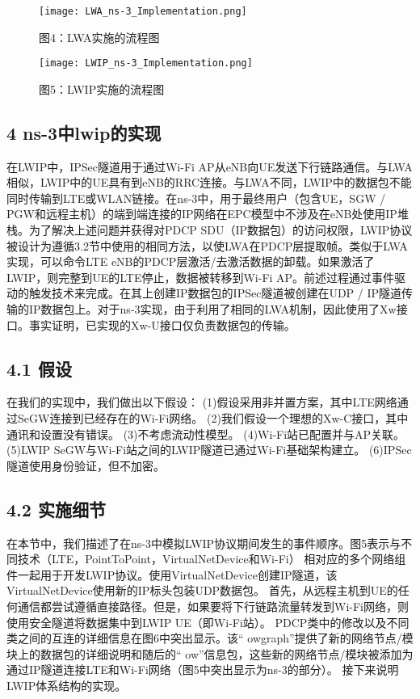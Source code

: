 \begin{figure}[htb]
  \centering
  \texttt{[image: LWA\_ns-3\_Implementation.png]}
  \caption*{图4：LWA实施的流程图}
\end{figure}


\begin{figure}[htb]
  \centering
  \texttt{[image: LWIP\_ns-3\_Implementation.png]}
  \caption{图5：LWIP实施的流程图}
\end{figure}

\newpage
\subsection*{4 ns-3中lwip的实现}
在LWIP中，IPSec隧道用于通过Wi-Fi AP从eNB向UE发送下行链路通信。与LWA相似，LWIP中的UE具有到eNB的RRC连接。与LWA不同，LWIP中的数据包不能同时传输到LTE或WLAN链接。在ns-3中，用于最终用户（包含UE，SGW / PGW和远程主机）的端到端连接的IP网络在EPC模型中不涉及在eNB处使用IP堆栈。为了解决上述问题并获得对PDCP SDU（IP数据包）的访问权限，LWIP协议被设计为遵循3.2节中使用的相同方法，以使LWA在PDCP层提取帧。类似于LWA实现，可以命令LTE eNB的PDCP层激活/去激活数据的卸载。如果激活了LWIP，则完整到UE的LTE停止，数据被转移到Wi-Fi AP。前述过程通过事件驱动的触发技术来完成。在其上创建IP数据包的IPSec隧道被创建在UDP / IP隧道传输的IP数据包上。对于ns-3实现，由于利用了相同的LWA机制，因此使用了Xw接口。事实证明，已实现的Xw-U接口仅负责数据包的传输。


\subsection*{4.1 假设}
在我们的实现中，我们做出以下假设：
(1)假设采用非并置方案，其中LTE网络通过SeGW连接到已经存在的Wi-Fi网络。
(2)我们假设一个理想的Xw-C接口，其中通讯和设置没有错误。
(3)不考虑流动性模型。
(4)Wi-Fi站已配置并与AP关联。
(5)LWIP SeGW与Wi-Fi站之间的LWIP隧道已通过Wi-Fi基础架构建立。
(6)IPSec隧道使用身份验证，但不加密。

\subsection*{4.2 实施细节}
在本节中，我们描述了在ns-3中模拟LWIP协议期间发生的事件顺序。图5表示与不同技术（LTE，PointToPoint，VirtualNetDevice和Wi-Fi）
相对应的多个网络组件一起用于开发LWIP协议。使用VirtualNetDevice创建IP隧道，该VirtualNetDevice使用新的IP标头包装UDP数据包。
首先，从远程主机到UE的任何通信都尝试遵循直接路径。但是，如果要将下行链路流量转发到Wi-Fi网络，则使用安全隧道将数据集中到LWIP UE（即Wi-Fi站）。
PDCP类中的修改以及不同类之间的互连的详细信息在图6中突出显示。该“ owgraph”提供了新的网络节点/模块上的数据包的详细说明和随后的“ ow”信息包，这些新的网络节点/模块被添加为通过IP隧道连接LTE和Wi-Fi网络（图5中突出显示为ns-3的部分）。
接下来说明LWIP体系结构的实现。

